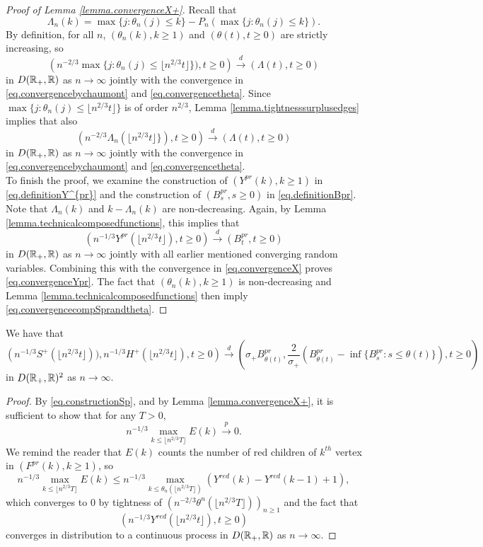 \begin{proof}[Proof of Lemma \ref{lemma.convergenceX+}]
Recall that 
$$\Lambda_n(k)=\max\{j:\theta_n(j)\leq k\}-P_n(\max\{j:\theta_n(j)\leq k\}). $$ By definition, for all $n$, $(\theta_n(k),k\geq 1)$ and $(\theta(t),t\geq 0)$ are strictly increasing, so
$$\left(n^{-2/3}\max\{j:\theta_n(j)\leq \lfloor n^{2/3} t \rfloor\} ),t\geq 0\right)\overset{d}{\to}\left( \Lambda(t),t\geq0 \right)$$
in $D({\mathbb R}_+,{\mathbb R})$ as $n\to \infty$ jointly with the convergence in \eqref{eq.convergencebychaumont} and \eqref{eq.convergencetheta}. Since $\max\{j:\theta_n(j)\leq \lfloor n^{2/3} t \rfloor\}$ is of order $n^{2/3}$, Lemma \ref{lemma.tightnesssurplusedges} implies that also 
$$\left(n^{-2/3}\Lambda_n\left(\lfloor n^{2/3} t \rfloor\} \right),t\geq 0\right)\overset{d}{\to}\left( \Lambda(t),t\geq0 \right)$$
in $D({\mathbb R}_+,{\mathbb R})$ as $n\to \infty$ jointly with the convergence in \eqref{eq.convergencebychaumont} and \eqref{eq.convergencetheta}.\\
To finish the proof, we examine the construction of $(Y^{pr}(k),k\geq 1)$ in \eqref{eq.definitionY^{pr}} and the construction of $(B^{pr}_s,s\geq 0)$ in \eqref{eq.definitionBpr}. 
Note that $\Lambda_n(k)$ and $k-\Lambda_n(k)$ are non-decreasing. Again, by Lemma \ref{lemma.technicalcomposedfunctions}, this implies that 
$$\left(n^{-1/3}Y^{pr}\left( \lfloor n^{2/3} t \rfloor \right), t\geq 0 \right)\overset{d}{\to} \left( B^{pr}_{t}, t\geq 0\right)$$
in $D({\mathbb R}_+,{\mathbb R})$ as $n\to \infty$ jointly with all earlier mentioned converging random variables. Combining this with the convergence in \eqref{eq.convergenceX} proves \eqref{eq.convergenceYpr}. The fact that $(\theta_n(k),k\geq 1)$ is non-decreasing and Lemma \ref{lemma.technicalcomposedfunctions} then imply \eqref{eq.convergencecompSprandtheta}. 
\end{proof}

\begin{lemma}\label{lemma.subtracterrorconverges}
We have that 
$$\left(n^{-1/3}S^{+}\left(\lfloor n^{2/3}t\rfloor \right)), n^{-1/3}H^{+}\left(\lfloor n^{2/3}t\rfloor \right) ,t\geq 0 \right) \overset{d}{\to} \left(\sigma_+ B^{pr}_{\theta (t)},\frac{2}{\sigma_+} \left(B^{pr}_{\theta (t)}-\inf\{B^{pr}_{s}:s\leq \theta(t)\}\right) ,t\geq 0 \right)$$
in $D({\mathbb R}_+,{\mathbb R})^2$ as $n\to \infty$. 
\end{lemma}


\begin{proof}
By \eqref{eq.constructionSp}, and by Lemma \ref{lemma.convergenceX+}, it is sufficient to show that for any $T>0$,
$$n^{-1/3}\max_{k\leq \lfloor n^{2/3}T\rfloor}E(k)\overset{p}{\to}0.$$
We remind the reader that $E(k)$ counts the number of red children of $k^{th}$ vertex in $(F^{pr}(k),k\geq 1)$, so
$$n^{-1/3}\max_{k\leq \lfloor n^{2/3}T\rfloor}E(k)\leq n^{-1/3}\max_{k\leq \theta_n(\lfloor n^{2/3}T\rfloor)}(Y^{red}(k)-Y^{red}(k-1)+1),$$
which converges to $0$ by tightness of $\left(n^{-2/3}\theta^{n}(\lfloor n^{2/3}T\rfloor)\right)_{n\geq 1}$ and the fact that $$\left(n^{-1/3}Y^{red}\left(\lfloor n^{2/3}t\rfloor\right),t\geq 0\right)$$ converges in distribution to a continuous process in $D({\mathbb R}_+,{\mathbb R})$ as $n\to\infty$.
\end{proof}

